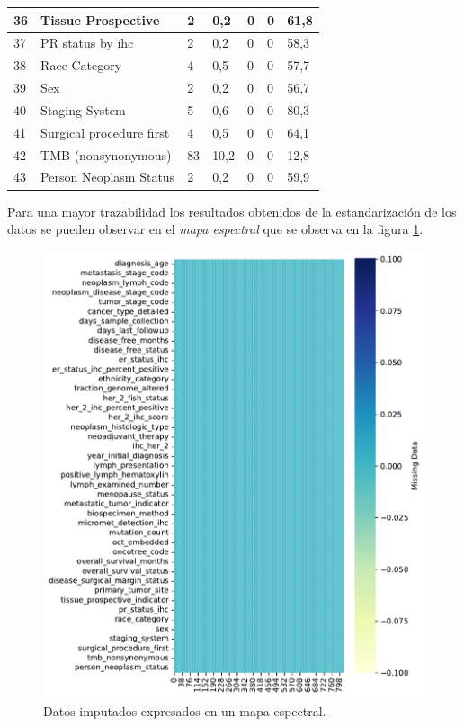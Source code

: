 \begin{table}[hbt!]
	\footnotesize
	\centering
	\begin{threeparttable}
		\begin{tabular}{p{0.5cm} p{4cm} p{1.5cm} p{2cm} p{1.5cm} p{2cm} p{1.5cm}} \toprule
					36	&	Tissue Prospective 	&	2	&	0,2	&	0	&	0	&	61,8
		\\ \hline	37	&	PR status by ihc	&	2	&	0,2	&	0	&	0	&	58,3
		\\ \hline	38	&	Race Category	&	4	&	0,5	&	0	&	0	&	57,7
		\\ \hline	39	&	Sex	&	2	&	0,2	&	0	&	0	&	56,7
		\\ \hline	40	&	Staging System	&	5	&	0,6	&	0	&	0	&	80,3
		\\ \hline	41	&	Surgical procedure first	&	4	&	0,5	&	0	&	0	&	64,1
		\\ \hline	42	&	TMB (nonsynonymous)	&	83	&	10,2	&	0	&	0	&	12,8
		\\ \hline	43	&	Person Neoplasm Status	&	2	&	0,2	&	0	&	0	&	59,9
		\\ \hline
		\end{tabular}
	\end{threeparttable}
\end{table}
Para una mayor trazabilidad los resultados obtenidos de la estandarización de los datos se pueden observar en el \textit{mapa espectral} que se observa en la figura \ref{impute_Spectrum}.

\begin{figure}[htb!]
	\centering
	\includegraphics[width=0.78
	\linewidth]{NOTEBOOK/IMAGENES_PERDIDAS/impute_heatmap}
	\caption{Datos imputados expresados en un mapa espectral.}
	\label{impute_Spectrum}
\end{figure}

\clearpage